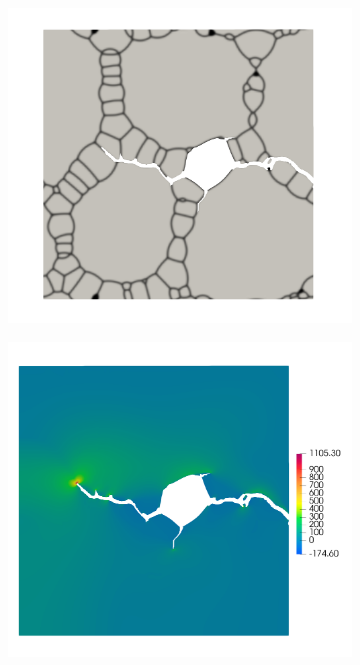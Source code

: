 \begin{figure}[htbp!]
  \centering
  \begin{subfigure}[t]{0.35\linewidth}
    \centering
    \includegraphics[width=\linewidth]{Chapter3/figures/partial_hbs_1}
    \caption{}
  \end{subfigure}
  \begin{subfigure}[t]{0.35\linewidth}
    \centering
    \includegraphics[width=\linewidth]{Chapter3/figures/partial_hbs_1_stress}
    \caption{}
  \end{subfigure}
  

\end{figure}
